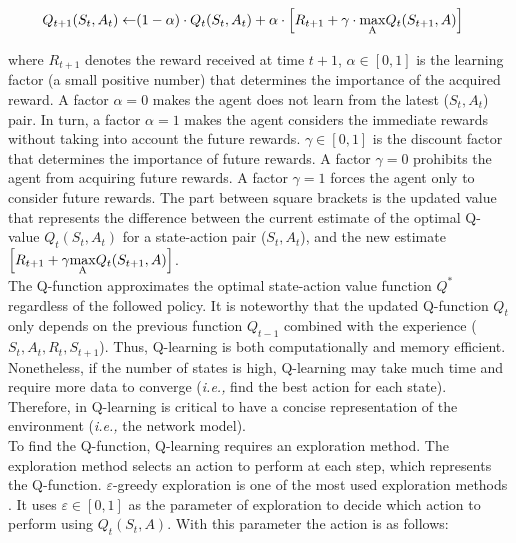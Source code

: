 {\setlength{\mathindent}{2cm}
\begin{equation}
    \begin{split}
        Q_{t+1}(S_t,A_t) \leftarrow & (1-\alpha) \cdot Q_{t}(S_t,A_t) + \alpha \cdot \left [R_{t+1} + \gamma \cdot \underset{\rm A}{\rm max} Q_{t}(S_{t+1},A) \right]
    \end{split}
    \label{equ:q_function}
\end{equation}
}

where $R_{t+1}$ denotes the reward received at time $t+ 1$, $\alpha \in \left [ 0,1 \right ]$ is the learning factor (a small positive number) that determines the importance of the acquired reward. A factor $\alpha = 0$ makes the agent does not learn from the latest ($S_t,A_t$) pair. In turn, a factor $\alpha = 1$ makes the agent considers the immediate rewards without taking into account the future rewards. $\gamma \in \left [ 0,1 \right ]$ is the discount factor that determines the importance of future rewards. A factor $\gamma = 0$ prohibits the agent from acquiring future rewards. A factor $\gamma = 1$ forces the agent only to consider future rewards. The part between square brackets is the updated value that represents the difference between the current estimate of the optimal Q-value $Q_t(S_t,A_t)$ for a state-action pair ($  S_{t}, A_{t} $), and the new estimate $ \left [R_{t+1} + \gamma  \underset{\rm A}{\rm max} Q_t(S_{t+1},A) \right ]$.\\

The Q-function approximates the optimal state-action value function $ Q^*$ regardless of the followed policy. It is noteworthy that the updated Q-function $Q_{t} $ only depends on the previous function $Q_{t-1} $ combined with the experience ($S_{t}, A_{t}, R_{t}, S_{t+1}$). Thus, Q-learning is both computationally and memory efficient. Nonetheless, if the number of states is high, Q-learning may take much time and require more data to converge (\textit{i.e.,} find the best action for each state). Therefore, in Q-learning is critical to have a concise representation of the environment (\textit{i.e.,} the network model).\\

To find the Q-function, Q-learning requires an exploration method. The exploration method selects an action to perform at each step, which represents the Q-function. $\varepsilon$-greedy exploration is one of the most used exploration methods \cite{teng_2012:exploration} \cite{Tijsma_2016:exploration_q_learning}. It uses $\varepsilon \in \left [ 0,1 \right ]$ as the parameter of exploration to decide which action to perform using $Q_{t}(S_{t},A)$. With this parameter the action is as follows:

